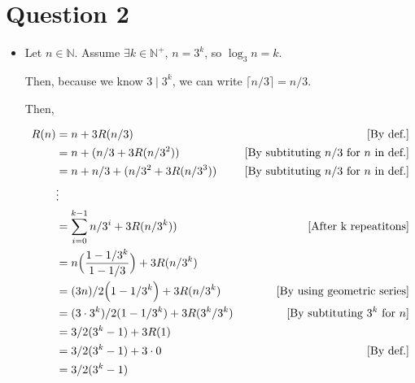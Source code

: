 \documentclass[12pt]{article}
\begin{document}
\section*{Question 2}
\begin{itemize}
    \item

    Let $n \in \mathbb{N}$. Assume $\exists k \in \mathbb{N}^+$, $n = 3^k$, so
    $\log_3 n = k$.

    \bigskip

    Then, because we know $3 \mid 3^k$, we can write $\lceil n/3 \rceil = n/3$.

    \bigskip

    Then,

    \begin{align}
        R(n) &= n + 3R(n/3) & [\text{By def.}]\\
        &= n + (n/3 +3R(n/3^2)) & [\text{By subtituting $n/3$ for $n$ in def.}]\\
        &= n + n/3 + (n/3^2 + 3R(n/3^3)) & [\text{By subtituting $n/3$ for $n$ in def.}]\\
        &\vdots\\
        &= \sum\limits_{i=0}^{k-1} n/3^i + 3R(n/3^k)) & [\text{After k repeatitons}]\\
        &= n \Bigl( \frac{1 - 1/3^k}{1 - 1/3} \Bigr) + 3R(n/3^k)\\
        &= (3n)/2 \Bigl( 1 - 1/3^k \Bigr) + 3R(n/3^k) & [\text{By using geometric series}]\\
        &= (3 \cdot 3^k)/2 ( 1 - 1/3^k) + 3R(3^k/3^k) & [\text{By subtituting $3^k$ for $n$}]\\
        &= 3/2 ( 3^k - 1) + 3R(1)\\
        &= 3/2 ( 3^k - 1) + 3 \cdot 0 & [\text{By def.}]\\
        &= 3/2 ( 3^k - 1)
    \end{align}
\end{itemize}

\bigskip
\end{document}
